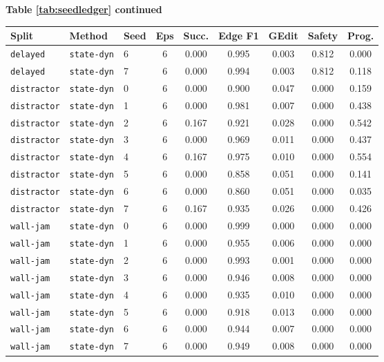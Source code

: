 \documentclass{article}
\begin{document}
\begin{center}
\textbf{Table \ref{tab:seedledger} continued}\\[0.4ex]
\begin{tabular}{lllcccccc}
\toprule
Split & Method & Seed & Eps & Succ. & Edge F1 & GEdit & Safety & Prog. \\
\midrule
\texttt{delayed} & \texttt{state-dyn} & 6 & 6 & 0.000 & 0.995 & 0.003 & 0.812 & 0.000 \\
\texttt{delayed} & \texttt{state-dyn} & 7 & 6 & 0.000 & 0.994 & 0.003 & 0.812 & 0.118 \\
\texttt{distractor} & \texttt{state-dyn} & 0 & 6 & 0.000 & 0.900 & 0.047 & 0.000 & 0.159 \\
\texttt{distractor} & \texttt{state-dyn} & 1 & 6 & 0.000 & 0.981 & 0.007 & 0.000 & 0.438 \\
\texttt{distractor} & \texttt{state-dyn} & 2 & 6 & 0.167 & 0.921 & 0.028 & 0.000 & 0.542 \\
\texttt{distractor} & \texttt{state-dyn} & 3 & 6 & 0.000 & 0.969 & 0.011 & 0.000 & 0.437 \\
\texttt{distractor} & \texttt{state-dyn} & 4 & 6 & 0.167 & 0.975 & 0.010 & 0.000 & 0.554 \\
\texttt{distractor} & \texttt{state-dyn} & 5 & 6 & 0.000 & 0.858 & 0.051 & 0.000 & 0.141 \\
\texttt{distractor} & \texttt{state-dyn} & 6 & 6 & 0.000 & 0.860 & 0.051 & 0.000 & 0.035 \\
\texttt{distractor} & \texttt{state-dyn} & 7 & 6 & 0.167 & 0.935 & 0.026 & 0.000 & 0.426 \\
\texttt{wall-jam} & \texttt{state-dyn} & 0 & 6 & 0.000 & 0.999 & 0.000 & 0.000 & 0.000 \\
\texttt{wall-jam} & \texttt{state-dyn} & 1 & 6 & 0.000 & 0.955 & 0.006 & 0.000 & 0.000 \\
\texttt{wall-jam} & \texttt{state-dyn} & 2 & 6 & 0.000 & 0.993 & 0.001 & 0.000 & 0.000 \\
\texttt{wall-jam} & \texttt{state-dyn} & 3 & 6 & 0.000 & 0.946 & 0.008 & 0.000 & 0.000 \\
\texttt{wall-jam} & \texttt{state-dyn} & 4 & 6 & 0.000 & 0.935 & 0.010 & 0.000 & 0.000 \\
\texttt{wall-jam} & \texttt{state-dyn} & 5 & 6 & 0.000 & 0.918 & 0.013 & 0.000 & 0.000 \\
\texttt{wall-jam} & \texttt{state-dyn} & 6 & 6 & 0.000 & 0.944 & 0.007 & 0.000 & 0.000 \\
\texttt{wall-jam} & \texttt{state-dyn} & 7 & 6 & 0.000 & 0.949 & 0.008 & 0.000 & 0.000 \\

\end{tabular}
\end{center}
\end{document}
